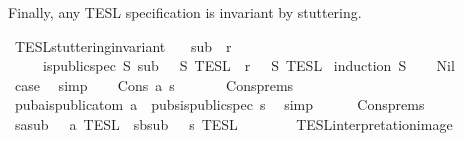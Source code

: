 \begin{isabellebody}
%
\endisadelimproof
%
\begin{isamarkuptext}%
Finally, any TESL specification is invariant by stuttering.%
\end{isamarkuptext}\isamarkuptrue%
\isamarkupfalse%
\ TESL{\isacharunderscore}stuttering{\isacharunderscore}invariant{\isacharcolon}\isanewline
\ \ \ {\isacartoucheopen}sub\ {\isasymlless}\ r{\isacartoucheclose}\isanewline
\ \ \ \ \ {\isacartoucheopen}{\isasymlbrakk}is{\isacharunderscore}public{\isacharunderscore}spec\ S{\isacharsemicolon}\ sub\ {\isasymin}\ {\isasymlbrakk}{\isasymlbrakk}\ S\ {\isasymrbrakk}{\isasymrbrakk}\isactrlsub T\isactrlsub E\isactrlsub S\isactrlsub L{\isasymrbrakk}\ {\isasymLongrightarrow}\ r\ {\isasymin}\ {\isasymlbrakk}{\isasymlbrakk}\ S\ {\isasymrbrakk}{\isasymrbrakk}\isactrlsub T\isactrlsub E\isactrlsub S\isactrlsub L{\isacartoucheclose}\isanewline
%
\isadelimproof
%
\endisadelimproof
%
\isatagproof
{}\isamarkupfalse%
\ {\isacharparenleft}induction\ S{\isacharparenright}\isanewline
\ \ \isamarkupfalse%
\ Nil\isanewline
\ \ \ \ \isamarkupfalse%
\ {\isacharquery}case\ \isamarkupfalse%
\ simp\isanewline
{}\isamarkupfalse%
\isanewline
\ \ \isamarkupfalse%
\ {\isacharparenleft}Cons\ a\ s{\isacharparenright}\ \isamarkupfalse%
\isanewline
\ \ \ \ \isamarkupfalse%
\ Cons{\isachardot}prems{\isacharparenleft}{}{\isacharparenright}\ \isamarkupfalse%
\ puba{\isacharcolon}{\isacartoucheopen}is{\isacharunderscore}public{\isacharunderscore}atom\ a{\isacartoucheclose}\ \ pubs{\isacharcolon}{\isacartoucheopen}is{\isacharunderscore}public{\isacharunderscore}spec\ s{\isacartoucheclose}\ \isamarkupfalse%
\ simp{\isacharplus}\isanewline
\ \ \ \ \isamarkupfalse%
\ Cons{\isachardot}prems{\isacharparenleft}{}{\isacharparenright}\ \isamarkupfalse%
\ sa{\isacharcolon}{\isacartoucheopen}sub\ {\isasymin}\ {\isasymlbrakk}\ a\ {\isasymrbrakk}\isactrlsub T\isactrlsub E\isactrlsub S\isactrlsub L{\isacartoucheclose}\ \ sb{\isacharcolon}{\isacartoucheopen}sub\ {\isasymin}\ {\isasymlbrakk}{\isasymlbrakk}\ s\ {\isasymrbrakk}{\isasymrbrakk}\isactrlsub T\isactrlsub E\isactrlsub S\isactrlsub L{\isacartoucheclose}\isanewline
\ \ \ \ \ \ \isamarkupfalse%
\ TESL{\isacharunderscore}interpretation{\isacharunderscore}image\ \isamarkupfalse%

\end{isabellebody}
